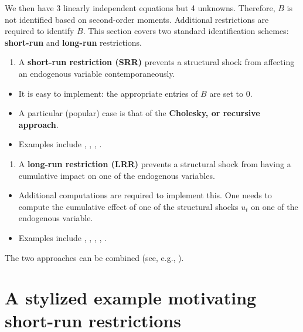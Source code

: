 \documentclass[
  12pt,
]{book}
\providecommand{\tightlist}{%
  \setlength{\itemsep}{0pt}\setlength{\parskip}{0pt}}
\theoremstyle{definition}
\theoremstyle{definition}
\theoremstyle{definition}
\theoremstyle{definition}
\theoremstyle{remark}
\begin{document}
We then have 3 linearly independent equations but 4 unknowns. Therefore, \(B\) is not identified based on second-order moments. Additional restrictions are required to identify \(B\). This section covers two standard identification schemes: \textbf{short-run} and \textbf{long-run} restrictions.

\begin{enumerate}
\def\labelenumi{\arabic{enumi}.}
\tightlist
\item
  A \textbf{short-run restriction (SRR)} prevents a structural shock from affecting an endogenous variable contemporaneously.
\end{enumerate}

\begin{itemize}
\tightlist
\item
  It is easy to implement: the appropriate entries of \(B\) are set to 0.
\item
  A particular (popular) case is that of the \textbf{Cholesky, or recursive approach}.
\item
  Examples include \citet{BERNANKE198649}, \citet{Sims_1986}, \citet{Gali_1992}, \citet{RubioRamirez_et_al_2010}.
\end{itemize}

\begin{enumerate}
\def\labelenumi{\arabic{enumi}.}
\setcounter{enumi}{1}
\tightlist
\item
  A \textbf{long-run restriction (LRR)} prevents a structural shock from having a cumulative impact on one of the endogenous variables.
\end{enumerate}

\begin{itemize}
\tightlist
\item
  Additional computations are required to implement this. One needs to compute the cumulative effect of one of the structural shocks \(u_{t}\) on one of the endogenous variable.
\item
  Examples include \citet{Blanchard_Quah_1989}, \citet{Faust_Leeper_1997}, \citet{Gali_1999}, \citet{Erceg_et_al_2005}, \citet{NBERc11177}.
\end{itemize}

The two approaches can be combined (see, e.g., \citet{Gerlach_Smets_1995}).

\section{A stylized example motivating short-run restrictions}\label{a-stylized-example-motivating-short-run-restrictions}
\end{document}
